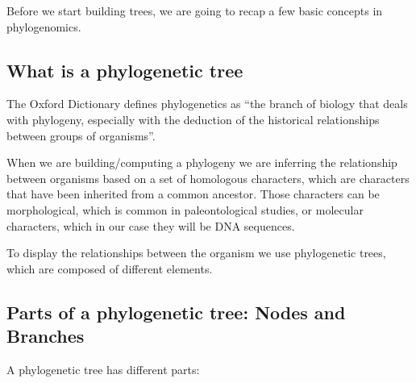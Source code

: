 \documentclass[
  letterpaper,
]{book}
\begin{document}
Before we start building trees, we are going to recap a few basic
concepts in phylogenomics.

\hypertarget{what-is-a-phylogenetic-tree}{%
\subsection{What is a phylogenetic
tree}\label{what-is-a-phylogenetic-tree}}

The Oxford Dictionary defines phylogenetics as ``the branch of biology
that deals with phylogeny, especially with the deduction of the
historical relationships between groups of organisms''.

When we are building/computing a phylogeny we are inferring the
relationship between organisms based on a set of homologous characters,
which are characters that have been inherited from a common ancestor.
Those characters can be morphological, which is common in
paleontological studies, or molecular characters, which in our case they
will be DNA sequences.

To display the relationships between the organism we use phylogenetic
trees, which are composed of different elements.

\hypertarget{parts-of-a-phylogenetic-tree-nodes-and-branches}{%
\subsection{Parts of a phylogenetic tree: Nodes and
Branches}\label{parts-of-a-phylogenetic-tree-nodes-and-branches}}

A phylogenetic tree has different parts:
\end{document}
